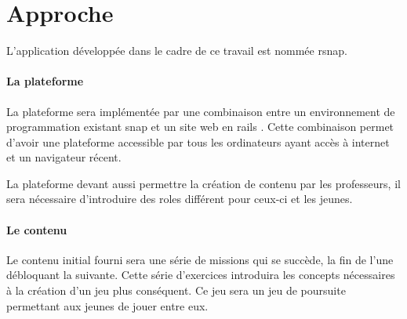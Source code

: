 \section{Approche}
\label{intro-approche}
L'application développée dans le cadre de ce travail est nommée \gls{rsnap}.

\paragraph{La plateforme} La plateforme sera implémentée par une combinaison entre un environnement de programmation existant \gls{snap} \cite{snap} et un site web en \gls{rails} \cite{rails}. Cette combinaison permet d'avoir une plateforme accessible par tous les ordinateurs ayant accès à internet et un navigateur récent.

La plateforme devant aussi permettre la création de contenu par les professeurs, il sera nécessaire d'introduire des \glspl{role} différent pour ceux-ci et les jeunes.

\paragraph{Le contenu} Le contenu initial fourni sera une série de \glspl{mission} qui se succède, la fin de l'une débloquant la suivante. Cette série d'exercices introduira les concepts nécessaires à la création d'un jeu plus conséquent. Ce jeu sera un jeu de poursuite permettant aux jeunes de jouer entre eux.
